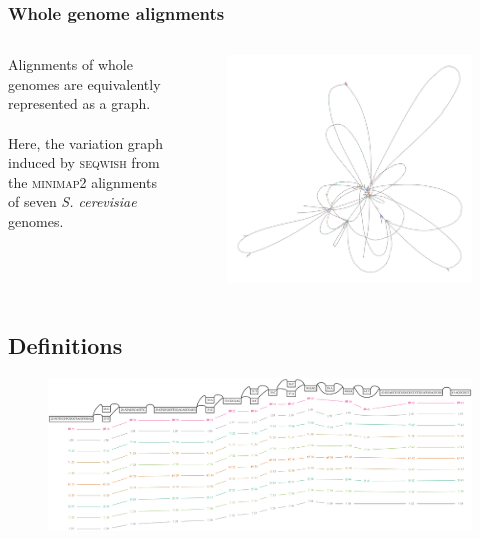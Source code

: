 \documentclass{beamer}
\begin{document}
\begin{frame}
  \frametitle{Whole genome alignments}
  \begin{columns}[c] %

    Alignments of whole genomes are equivalently represented as a graph.
    \\~\\
    Here, the variation graph induced by \textsc{seqwish} from the  \textsc{minimap2} alignments of seven \emph{S. cerevisiae} genomes.

    \begin{figure}
      \includegraphics[scale=0.145,center]{seqwish_yeast.png}
    \end{figure}
  \end{columns}
\end{frame}


\subsection{Definitions}

\begin{frame}
  \begin{figure}
    \includegraphics[scale=0.3,center]{H_3136.pdf}
  \end{figure}
\end{frame}
\end{document}
